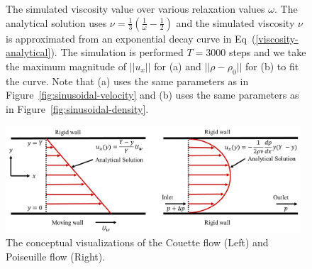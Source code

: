 \begin{figure}[H]
  \begin{center}
    \caption{The simulated viscosity value 
    over various relaxation values $\omega$.
    The analytical solution uses $\nu = \frac{1}{3}(\frac{1}{\omega} - \frac{1}{2})$
    and the simulated viscosity $\nu$ is approximated from an exponential decay curve in Eq~(\ref{viscosity-analytical}).
    The simulation is performed $T = 3000$ steps
    and we take the maximum magnitude of
    $|| u_x ||$ for (a) and $|| \rho - \rho_0 ||$ for (b)
    to fit the curve.
    Note that (a) uses the same parameters as in 
    Figure~\ref{fig:sinusoidal-velocity}
    and (b) uses the same parameters as in
    Figure~\ref{fig:sinusoidal-density}.
    \label{fig:omega-vs-visc}}
  \end{center}
\end{figure}

\begin{figure}[H]
  \centering
  \includegraphics[width=0.98\textwidth]{imgs/couette_and_poiseuille.pdf}
  \caption{The conceptual visualizations of the Couette flow (Left) and
  Poiseuille flow (Right).}
  \vspace{-5mm}
  \label{couette-and-poiseuille-conceptual}
\end{figure}


